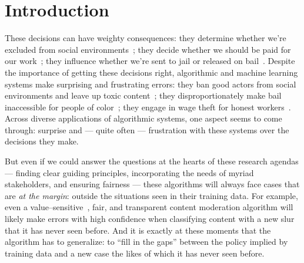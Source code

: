 \documentclass[street-level_algorithms]{subfiles}
\begin{document}
\section{Introduction}

These decisions can have weighty consequences:
they determine whether we're excluded from social environments~\cite{gillespie2018custodians,geiger2010work};
they decide whether we should be paid for our work~\cite{takingAHITMcInnis};
they influence whether we're sent to jail or released on bail~\cite{huq2018racial}.
Despite the importance of getting these decisions right,
algorithmic and machine learning systems make surprising and frustrating errors:
they ban good actors from social environments and leave up toxic content~\cite{halfaker2013rise,chancellor2016thyghgapp};
they disproportionately make bail inaccessible for people of color~\cite{propublica};
they engage in wage theft for honest workers~\cite{takingAHITMcInnis}.
Across diverse applications of algorithmic systems,
one aspect seems to come through:
surprise and
--- quite often ---
frustration with these systems over the decisions they make.

But even if we could answer the questions at the hearts of these research agendas
--- finding clear guiding principles,
    incorporating the needs of myriad stakeholders, and
    ensuring fairness ---
these algorithms will always face cases that are \textit{at the margin}:
outside the situations seen in their training data.
For example, even a value--sensitive~\cite{zhuvalue}, fair, and transparent content moderation algorithm will likely
make errors with high confidence when classifying content with a new slur that it has never seen before.
And it is exactly at these moments that the algorithm has to generalize:
to ``fill in the gaps'' between the policy implied by training data and
a new case the likes of which it has never seen before.
\end{document}
